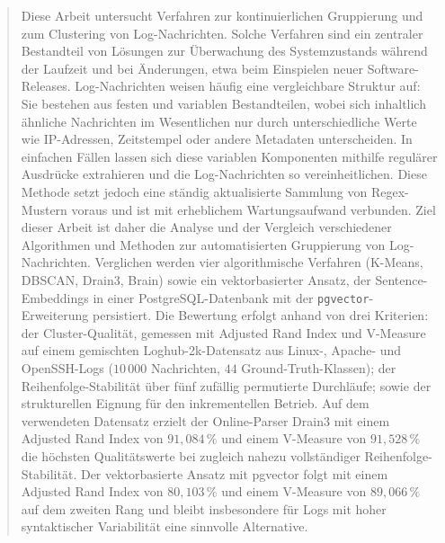 




 
\begin{abstract}
Diese Arbeit untersucht Verfahren zur kontinuierlichen Gruppierung und zum Clustering von Log-Nachrichten. Solche Verfahren sind ein zentraler Bestandteil von Lösungen zur Überwachung des Systemzustands während der Laufzeit und bei Änderungen, etwa beim Einspielen neuer Software-Releases. Log-Nachrichten weisen häufig eine vergleichbare Struktur auf: Sie bestehen aus festen und variablen Bestandteilen, wobei sich inhaltlich ähnliche Nachrichten im Wesentlichen nur durch unterschiedliche Werte wie IP-Adressen, Zeitstempel oder andere Metadaten unterscheiden.
In einfachen Fällen lassen sich diese variablen Komponenten mithilfe regulärer Ausdrücke extrahieren und die Log-Nachrichten so vereinheitlichen. Diese Methode setzt jedoch eine ständig aktualisierte Sammlung von Regex-Mustern voraus und ist mit erheblichem Wartungsaufwand verbunden. Ziel dieser Arbeit ist daher die Analyse und der Vergleich verschiedener Algorithmen und Methoden zur automatisierten Gruppierung von Log-Nachrichten. Verglichen werden vier algorithmische Verfahren (K-Means, DBSCAN, Drain3, Brain) sowie ein vektorbasierter Ansatz, der Sentence-Embeddings in einer PostgreSQL-Datenbank mit der \texttt{pgvector}-Erweiterung persistiert. Die Bewertung erfolgt anhand von drei Kriterien: der Cluster-Qualität, gemessen mit Adjusted Rand Index und V-Measure auf einem gemischten Loghub-2k-Datensatz aus Linux-, Apache- und OpenSSH-Logs ($10\,000$ Nachrichten, $44$ Ground-Truth-Klassen); der Reihenfolge-Stabilität über fünf zufällig permutierte Durchläufe; sowie der strukturellen Eignung für den inkrementellen Betrieb. Auf dem verwendeten Datensatz erzielt der Online-Parser Drain3 mit einem Adjusted Rand Index von $91{,}084\,\%$ und einem V-Measure von $91{,}528\,\%$ die höchsten Qualitätswerte bei zugleich nahezu vollständiger Reihenfolge-Stabilität. Der vektorbasierte Ansatz mit pgvector folgt mit einem Adjusted Rand Index von $80{,}103\,\%$ und einem V-Measure von $89{,}066\,\%$ auf dem zweiten Rang und bleibt insbesondere für Logs mit hoher syntaktischer Variabilität eine sinnvolle Alternative.
\end{abstract}
\cleardoublepage